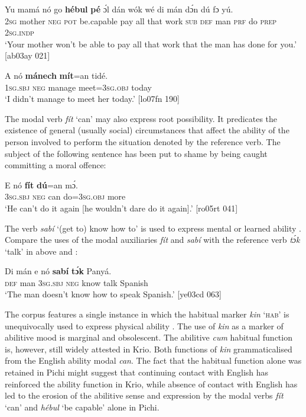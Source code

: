 \ea%
    \label{ex:key:407}
    \gll Yu  mamá  nó  go  \textbf{hébul}    \textbf{pé}  ɔ́l  dán    wók    
wé  di  mán dɔ́n  dú  fɔ  yú.\\
\textsc{2sg}  mother  \textsc{neg}  \textsc{pot}  be.capable  pay  all  that    work  
\textsc{sub}  \textsc{def}  man \textsc{prf}  do  \textsc{prep}  \textsc{2sg.indp}\\

\glt ‘Your mother won’t be able to pay all that work that the man has done 
for you.’ [ab03ay 021]
\z


\ea%
    \label{ex:key:408}
    \gll \MakeUppercase{A}   nó  \textbf{mánech}  \textbf{mít}=an    tidé.\\
\textsc{1sg.sbj}  \textsc{neg}  manage  meet=\textsc{3sg.obj}  today\\

\glt ‘I didn’t manage to meet her today.’ [lo07fn 190]
\z

The modal verb \textit{fít} ‘can’ may also express root possibility. It predicates the existence of general (usually social) circumstances that affect the ability of the person involved to perform the situation denoted by the reference verb. The subject of the following sentence has been put to shame by being caught committing a moral offence: 


\ea%
    \label{ex:key:409}
    \gll E    nó  \textbf{fít}  \textbf{dú}=an    mɔ́.\\
\textsc{3sg.sbj}  \textsc{neg}  can  do=\textsc{3sg.obj}  more\\

\glt ‘He can’t do it again [he wouldn’t dare do it again].’ [ro05rt 041]
\z

The verb \textit{sabí} ‘(get to) know how to’ is used to express mental or learned ability . Compare the uses of the modal auxiliaries \textit{fít} and \textit{sabí} with the reference verb \textit{tɔ́k} ‘talk’ in  above and :


\ea%
    \label{ex:key:410}
    \gll Di  mán    e    nó  \textbf{sabí}    \textbf{tɔ́k}  Panyá.\\
\textsc{def}  man    \textsc{3sg.sbj}  \textsc{neg}  know  talk  Spanish\\

\glt ‘The man doesn’t know how to speak Spanish.’ [ye03cd 063]
\z

The corpus features a single instance in which the habitual marker \textit{kin} ‘\textsc{hab}’ is unequivocally used to express physical ability . The use of \textit{kin} as a marker of abilitive mood is marginal and obsolescent. The abilitive \textit{cum} habitual function is, however, still widely attested in Krio. Both functions of \textit{kin} grammaticalised from the English ability modal \textit{can}. The fact that the habitual function alone was retained in Pichi might suggest that continuing contact with English has reinforced the ability function in Krio, while absence of contact with English has led to the erosion of the abilitive sense and expression by the modal verbs \textit{fít} ‘can’ and \textit{hébul} ‘be capable’ alone in Pichi.


